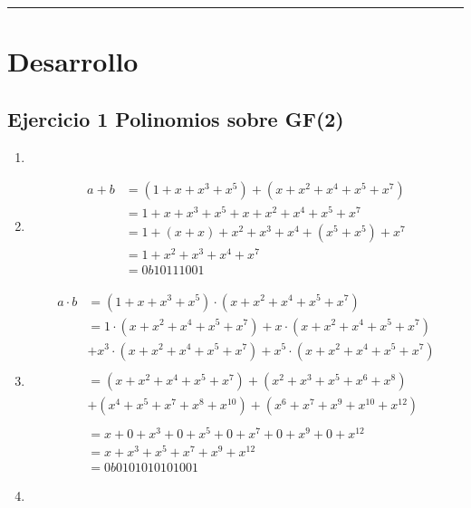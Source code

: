 \documentclass[11pt,fleqn]{article}
\begin{document}
\vspace{1em}
\hrule
\vspace{1em}


\section*{Desarrollo}

\subsection*{Ejercicio 1 Polinomios sobre GF(2)}
\begin{enumerate}[label=\alph*)]
\item {}

\item {}
\begin{align*}
    a+b
    &=(1+x+x^3+x^5)+(x+x^2+x^4+x^5+x^7)\\
    &=1+x+x^3+x^5+x+x^2+x^4+x^5+x^7\\
    &=1+(x+x)+x^2+x^3+x^4+(x^5+x^5)+x^7\\
    &=1+x^2+x^3+x^4+x^7\\
    &=0b10111001
\end{align*}

\item {}
\begin{align*}
a\cdot b
&=(1+x+x^3+x^5)\cdot(x+x^2+x^4+x^5+x^7)\\
&=1\cdot(x+x^2+x^4+x^5+x^7)+x\cdot(x+x^2+x^4+x^5+x^7)\\
&+x^3\cdot(x+x^2+x^4+x^5+x^7)+x^5\cdot(x+x^2+x^4+x^5+x^7)\\ \\
&=(x+x^2+x^4+x^5+x^7)+(x^2+x^3+x^5+x^6+x^8)\\
&+(x^4+x^5+x^7+x^8+x^{10})+(x^6+x^7+x^9+x^{10}+x^{12})\\ \\
&=x+0+x^3+0+x^5+0+x^7+0+x^9+0+x^{12}\\
&=x+x^3+x^5+x^7+x^9+x^{12}\\
&=0b0101010101001
\end{align*}

\item {}
\\ \\
\EId
\end{enumerate}
\end{document}
